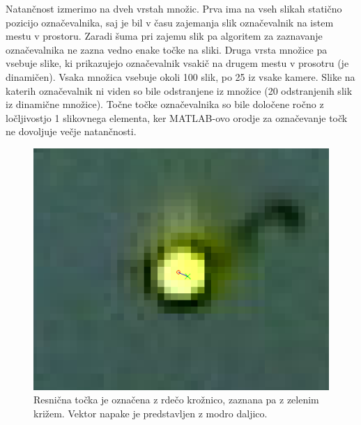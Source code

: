 \documentclass[a4paper, 12pt]{book}
\begin{document}
Natančnost izmerimo na dveh vrstah množic. Prva ima na vseh slikah statično pozicijo označevalnika, saj je bil v času zajemanja slik označevalnik na istem mestu v prostoru. Zaradi šuma pri zajemu slik pa algoritem za zaznavanje označevalnika ne zazna vedno enake točke na sliki. Druga vrsta množice pa vsebuje slike, ki prikazujejo označevalnik vsakič na drugem mestu v prosotru (je dinamičen). Vsaka množica vsebuje okoli 100 slik, po 25 iz vsake kamere. Slike na katerih označevalnik ni viden so bile odstranjene iz množice (20 odstranjenih slik iz dinamične množice). Točne točke označevalnika so bile določene ročno z ločljivostjo 1 slikovnega elementa, ker MATLAB-ovo orodje za označevanje točk ne dovoljuje večje natančnosti. 
\begin{figure}[H]
\centering
\includegraphics[width=\textwidth,height=\textheight,keepaspectratio]{marker_detection_example.png}
\caption{Resnična točka je označena z rdečo krožnico, zaznana pa z zelenim križem. Vektor napake je predstavljen z modro daljico.}
\label{mdetectioneximg}
\end{figure}
\end{document}
